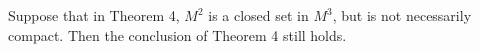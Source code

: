 Suppose that in Theorem 4, $M^2$ is a closed set in $M^3$, but is not necessarily compact. Then the conclusion of Theorem 4 still holds.

